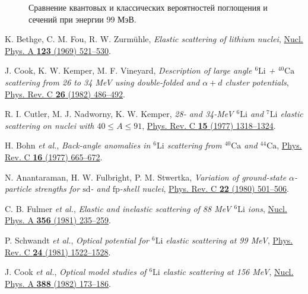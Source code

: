 \documentclass[a4paper, 12pt]{article}
\begin{document}
\begin{figure}
	\caption{Сравнение квантовых и классических вероятностей поглощения и сечений при энергии 99 МэВ.~\cite{99mev}}
	\label{fig:99mev-abs-ratio}
\end{figure}%

\clearpage
\begin{thebibliography}{99}%
	 K. Bethge, C. M. Fou, R. W. Zurm\"{u}hle, \textit{Elastic scattering of lithium nuclei}, \href{https://doi.org/10.1016/0375-9474(69)91001-X}{Nucl. Phys. A \textbf{123} (1969) 521--530}.

	 J. Cook, K. W. Kemper, M. F. Vineyard, \textit{Description of large angle $^{6}\mathrm{Li}$ + $^{40}\mathrm{Ca}$ scattering from 26 to 34 MeV using double-folded and $\ensuremath{\alpha}+d$ cluster potentials}, \href{http://dx.doi.org/10.1103/PhysRevC.26.486}{Phys. Rev. C \textbf{26} (1982) 486--492}.

	 R. I. Cutler, M. J. Nadworny, K. W. Kemper, \textit{28- and 34-MeV $^{6}\mathrm{Li}$ and $^{7}\mathrm{Li}$ elastic scattering on nuclei with $40\ensuremath{\le}A\ensuremath{\le}91$}, \href{https://dx.doi.org/10.1103/PhysRevC.15.1318}{Phys. Rev. C \textbf{15} (1977) 1318--1324}.

	 H. Bohn \textit{et al.}, \textit{Back-angle anomalies in $^{6}\mathrm{Li}$ scattering from $^{40}\mathrm{Ca}$ and $^{44}\mathrm{Ca}$}, \href{http://dx.doi.org/10.1103/PhysRevC.16.665}{Phys. Rev. C \textbf{16} (1977) 665--672}.

	 N. Anantaraman, H. W. Fulbright, P. M. Stwertka, \textit{Variation of ground-state $\ensuremath{\alpha}$\nobreakdash-particle strengths for $\mathrm{sd}$- and $\mathrm{fp}$-shell nuclei}, \href{http://dx.doi.org/10.1103/PhysRevC.22.501}{Phys. Rev. C \textbf{22} (1980) 501--506}.

	 C. B. Fulmer \textit{et al.}, \textit{Elastic and inelastic scattering of 88 MeV $^6\mathrm{Li}$ ions}, \href{https://doi.org/10.1016/0375-9474(81)90125-1}{Nucl. Phys. A \textbf{356} (1981) 235--259}.

	 P. Schwandt \textit{et al.}, \textit{Optical potential for $^{6}\mathrm{Li}$ elastic scattering at 99 MeV}, \href{http://dx.doi.org/10.1103/PhysRevC.24.1522}{Phys. Rev. C \textbf{24} (1981) 1522--1528}.

	 J. Cook \textit{et al.}, \textit{Optical model studies of $^6\mathrm{Li}$ elastic scattering at 156 MeV}, \href{https://doi.org/10.1016/0375-9474(82)90514-0}{Nucl. Phys. A \textbf{388} (1982) 173--186}.


\end{thebibliography}
\end{document}
